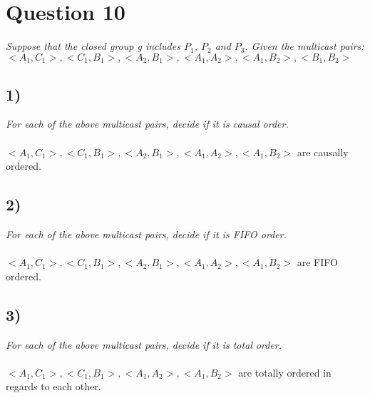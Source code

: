 \documentclass[a4paper, titlepage,12pt]{article}
\begin{document}
	\section*{Question 10}
	\emph{Suppose that the closed group g includes $P_1$, $P_2$ and $P_3$. Given the multicast pairs: $<A_1, C_1>, <C_1, B_1>, <A_2, B_1>, <A_1, A_2>, <A_1, B_2>, <B_1, B_2>$}
	\subsection*{1)}
	\emph{For each of the above multicast pairs, decide if it is causal order.}
\\\\
		$<A_1, C_1>, <C_1, B_1>, <A_2, B_1>, <A_1, A_2>, <A_1, B_2>$ are causally ordered.
	\subsection*{2)}
	\emph{For each of the above multicast pairs, decide if it is FIFO order.}
\\\\
		$<A_1, C_1>, <C_1, B_1>, <A_2, B_1>, <A_1, A_2>, <A_1, B_2>$ are FIFO ordered.
	\subsection*{3)}
	\emph{For each of the above multicast pairs, decide if it is total order.}
\\\\
		$<A_1, C_1>, <C_1, B_1>, <A_1, A_2>, <A_1, B_2>$ are totally ordered in regards to each other.
\end{document}
